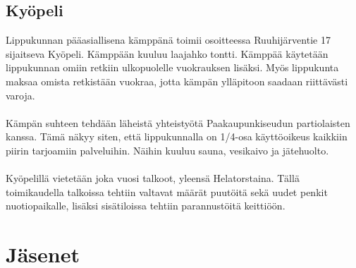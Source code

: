 \documentclass[a4paper, 12pt, finnish]{report} %
\begin{document}
\subsection{Kyöpeli}
Lippukunnan pääasiallisena kämppänä toimii osoitteessa Ruuhijärventie 17 sijaitseva Kyöpeli. Kämppään kuuluu laajahko tontti. Kämppää käytetään lippukunnan omiin retkiin ulkopuolelle vuokrauksen lisäksi. Myös lippukunta maksaa omista retkistään vuokraa, jotta kämpän ylläpitoon saadaan riittävästi varoja.\\
\\Kämpän suhteen tehdään läheistä yhteistyötä Paakaupunkiseudun partiolaisten kanssa. Tämä näkyy siten, että lippukunnalla on 1/4-osa käyttöoikeus kaikkiin piirin tarjoamiin palveluihin. Näihin kuuluu sauna, vesikaivo ja jätehuolto.\\
\\Kyöpelillä vietetään joka vuosi talkoot, yleensä Helatorstaina. Tällä toimikaudella talkoissa tehtiin valtavat määrät puutöitä sekä uudet penkit nuotiopaikalle, lisäksi sisätiloissa tehtiin parannustöitä keittiöön.
\newpage
\section{Jäsenet}
\newpage
\end{document}
